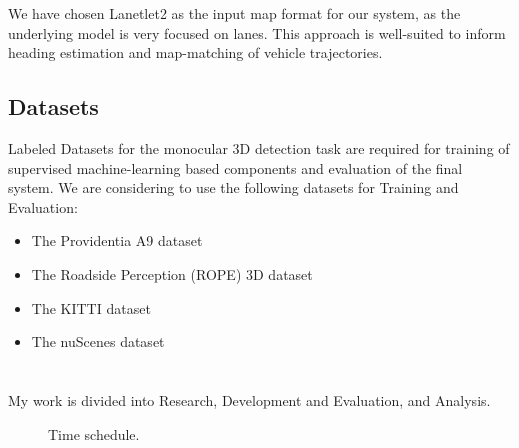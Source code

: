 \documentclass[RAIstudentexpose%
              ,optBibtex%
              ,optBibstyleAlphabetic%
              ,optEnglish%
              ]{RAIlatex}%
\begin{document}
We have chosen Lanetlet2 \cite{lanelet22018} as the input map format for our system, as the underlying model is very focused on lanes. This approach is well-suited to inform heading estimation and map-matching of vehicle trajectories. \par

\subsection{Datasets}

Labeled Datasets for the monocular 3D detection task are required for training of supervised machine-learning based components and evaluation of the final system. We are considering to use the following datasets for Training and Evaluation:

\begin{itemize}
\item The Providentia A9 dataset \cite{a92022}
\item The Roadside Perception (ROPE) 3D dataset \cite{rope3d2022}
\item The KITTI dataset \cite{kitti2012}
\item The nuScenes dataset \cite{nuscenes2020}
\end{itemize}

%
\section{}

My work is divided into Research, Development and Evaluation, and Analysis.

\begin{figure}[!htb]%
    \centering%
    
    \caption{Time schedule.}%
\end{figure}%

\section{}%

\printbibliography[heading=none]%
\end{document}

